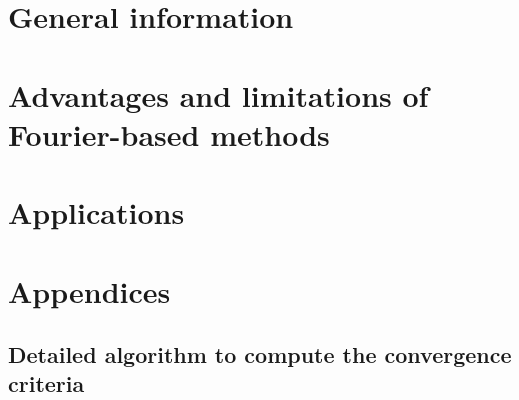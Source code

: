 \documentclass[a4paper, twoside, 11pt, openright]{book}
\begin{document}
\frontmatter

 

\cleardoublepage


% 

% 

\tableofcontents



% 



\mainmatter

\part{General information}
\label{part1}




\part{Advantages and limitations of Fourier-based methods}
\label{part2}





\part{Applications}
\label{part3}







\appendix

\part*{Appendices}
\chapter{Detailed algorithm to compute the convergence criteria}

\end{document}
